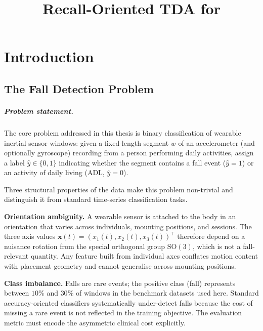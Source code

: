 \documentclass[onluarkali,ingilizce,yukseklisans,karton,LisansustuEgitim]{itutez}
\title{Recall-Oriented TDA for}
      {Wearable-Sensor Fall Detection}
      {}
\providecommand{\1}{\mathbf{1}}
\begin{document}
\setcounter{secnumdepth}{3}
\setcounter{tocdepth}{3}

\chapter{Introduction}
\label{sec:introduction}

\section{The Fall Detection Problem}
\label{subsec:motivation}

\paragraph{Problem statement.}
The core problem addressed in this thesis is binary classification of wearable inertial sensor windows: given a fixed-length segment $w$ of an accelerometer (and optionally gyroscope) recording from a person performing daily activities, assign a label $\hat{y}\in\{0,1\}$ indicating whether the segment contains a fall event ($\hat{y}=1$) or an activity of daily living (ADL, $\hat{y}=0$).

Three structural properties of the data make this problem non-trivial and distinguish it from standard time-series classification tasks.

\textbf{Orientation ambiguity.} A wearable sensor is attached to the body in an orientation that varies across individuals, mounting positions, and sessions. The three axis values $\mathbf{x}(t)=(x_1(t),x_2(t),x_3(t))^\top$ therefore depend on a nuisance rotation from the special orthogonal group $\mathrm{SO}(3)$, which is not a fall-relevant quantity. Any feature built from individual axes conflates motion content with placement geometry and cannot generalise across mounting positions.

\textbf{Class imbalance.} Falls are rare events; the positive class (fall) represents between $10\%$ and $30\%$ of windows in the benchmark datasets used here. Standard accuracy-oriented classifiers systematically under-detect falls because the cost of missing a rare event is not reflected in the training objective. The evaluation metric must encode the asymmetric clinical cost explicitly.
\end{document}
